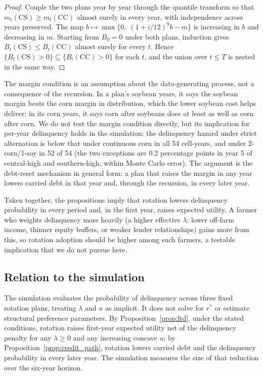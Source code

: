 \documentclass[11pt,letterpaper]{article}
\theoremstyle{remark}
\begin{document}
\begin{proof}
Couple the two plans year by year through the quantile transform so that $m_t(\text{CS}) \geq m_t(\text{CC})$ almost surely in every year, with independence across years preserved. The map $b \mapsto \max\{0,\; (1+i/12)^{9}b - m\}$ is increasing in $b$ and decreasing in $m$. Starting from $B_0 = 0$ under both plans, induction gives $B_t(\text{CS}) \leq B_t(\text{CC})$ almost surely for every $t$. Hence $\{B_t(\text{CS}) > 0\} \subseteq \{B_t(\text{CC}) > 0\}$ for each $t$, and the union over $t \leq T$ is nested in the same way.
\end{proof}
 
The margin condition is an assumption about the data-generating process, not a consequence of the recursion. In a plan's soybean years, it says the soybean margin beats the corn margin in distribution, which the lower soybean cost helps deliver; in its corn years, it says corn after soybeans does at least as well as corn after corn. We do not test the margin condition directly, but its implication for per-year delinquency holds in the simulation: the delinquency hazard under strict alternation is below that under continuous corn in all 54 cell-years, and under 2-corn/1-soy in 52 of 54 (the two exceptions are 0.2 percentage points in year 5 of central-high and southern-high, within Monte Carlo error). The argument is the debt-reset mechanism in general form: a plan that raises the margin in any year lowers carried debt in that year and, through the recursion, in every later year.

Taken together, the propositions imply that rotation lowers delinquency probability in every period and, in the first year, raises expected utility. A farmer who weights delinquency more heavily (a higher effective $\lambda$: lower off-farm income, thinner equity buffers, or weaker lender relationships) gains more from this, so rotation adoption should be higher among such farmers, a testable implication that we do not pursue here.
 
\subsection{\label{relation_sim}Relation to the simulation}
 
The simulation evaluates the probability of delinquency across three fixed rotation plans, treating $\lambda$ and $u$ as implicit. It does not solve for $r^*$ or estimate structural preference parameters. By Proposition~\ref{prop:ltd}, under the stated conditions, rotation raises first-year expected utility net of the delinquency penalty for any $\lambda \geq 0$ and any increasing concave $u$; by Proposition~\ref{prop:credit_path}, rotation lowers carried debt and the delinquency probability in every later year. The simulation measures the size of that reduction over the six-year horizon.
 
\end{document}
